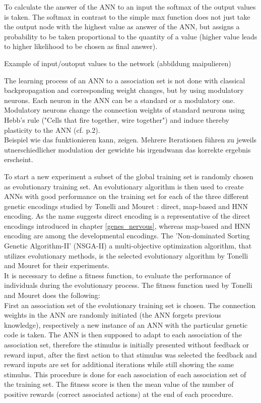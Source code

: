 \documentclass[12pt,twoside]{article}
\theoremstyle{plain}
\theoremstyle{definition}
\theoremstyle{remark}
\begin{document}
To calculate the answer of the ANN to an input the softmax of the output values is taken. The softmax in contrast to the simple max function does not just take the output node with the highest value as answer of the ANN, but assigns a probability to be taken proportional to the quantity of a value (higher value leads to higher likelihood to be chosen as final answer).\medskip

Example of input/outoput values to the network (abbildung maipulieren)\medskip

The learning process of an ANN to a association set is not done with classical backpropagation and corresponding weight changes, but by using modulatory neurons.
Each neuron in the ANN can be a standard or a modulatory one.
Modulatory neurons change the connection weights of standard neurons using Hebb's rule ("Cells that fire together, wire together") and induce thereby plasticity to the ANN (cf. \cite{citeulike:12788284} p.2).\\
Beispiel wie das funktionieren kann, zeigen. Mehrere Iterationen führen zu jeweils utnerschiedlicher modulation der gewichte bis irgendwann das korrekte ergebnis erscheint. \medskip

To start a new experiment a subset of the global training set is randomly chosen as evolutionary training set.
An evolutionary algorithm is then used to create ANNs with good performance on the training set for each of the three different genetic encodings studied by Tonelli and Mouret : direct, map-based and HNN encoding. As the name suggests direct encoding is a representative of the direct encodings introduced in chapter \ref{genes_nervous}, whereas map-based and HNN encoding are among the developmental encodings.
The 'Non-dominated Sorting Genetic Algorithm-II' (NSGA-II) a multi-objective optimization algorithm, that utilizes evolutionary methods, is the selected evolutionary algorithm by Tonelli and Mouret for their experiments.\\
It is necessary to define a fitness function, to evaluate the performance of individuals during the evolutionary process. The fitness function used by Tonelli and Mouret does the following:\\
First an association set of the evolutionary training set is chosen. The connection weights in the ANN are randomly initiated (the ANN forgets previous knowledge), respectively a new instance of an ANN with the particular genetic code is taken. The ANN is then supposed to adapt to each association of the association set, therefore the stimulus is initially presented without feedback or reward input, after the first action to that stimulus was selected the feedback and reward inputs are set for additional iterations while still showing the same stimulus. This procedure is done for each association of each association set of the training set. The fitness score is then the mean value of the number of positive rewards (correct associated actions) at the end of each procedure.\medskip
\end{document}
